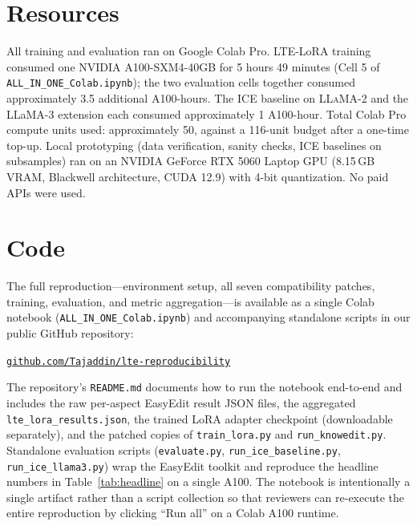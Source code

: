 \documentclass[11pt,a4paper,twocolumn]{article}
\begin{document}
\section{Resources}
\label{sec:resources}

All training and evaluation ran on Google Colab Pro. LTE-LoRA training consumed one NVIDIA A100-SXM4-40GB for 5 hours 49 minutes (Cell 5 of \texttt{ALL\_IN\_ONE\_Colab.ipynb}); the two evaluation cells together consumed approximately 3.5 additional A100-hours. The ICE baseline on \textsc{LLaMA-2} and the LLaMA-3 extension each consumed approximately 1 A100-hour. Total Colab Pro compute units used: approximately 50, against a 116-unit budget after a one-time top-up. Local prototyping (data verification, sanity checks, ICE baselines on subsamples) ran on an NVIDIA GeForce RTX 5060 Laptop GPU (8.15\,GB VRAM, Blackwell architecture, CUDA 12.9) with 4-bit quantization. No paid APIs were used.

\section{Code}
\label{sec:code}

The full reproduction---environment setup, all seven compatibility patches, training, evaluation, and metric aggregation---is available as a single Colab notebook (\texttt{ALL\_IN\_ONE\_Colab.ipynb}) and accompanying standalone scripts in our public GitHub repository:

\begin{center}
\href{https://github.com/Tajaddin/lte-reproducibility}{\texttt{github.com/Tajaddin/lte-reproducibility}}
\end{center}

The repository's \texttt{README.md} documents how to run the notebook end-to-end and includes the raw per-aspect EasyEdit result JSON files, the aggregated \texttt{lte\_lora\_results.json}, the trained LoRA adapter checkpoint (downloadable separately), and the patched copies of \texttt{train\_lora.py} and \texttt{run\_knowedit.py}. Standalone evaluation scripts (\texttt{evaluate.py}, \texttt{run\_ice\_baseline.py}, \texttt{run\_ice\_llama3.py}) wrap the EasyEdit toolkit and reproduce the headline numbers in Table~\ref{tab:headline} on a single A100. The notebook is intentionally a single artifact rather than a script collection so that reviewers can re-execute the entire reproduction by clicking ``Run all'' on a Colab A100 runtime.
\end{document}
